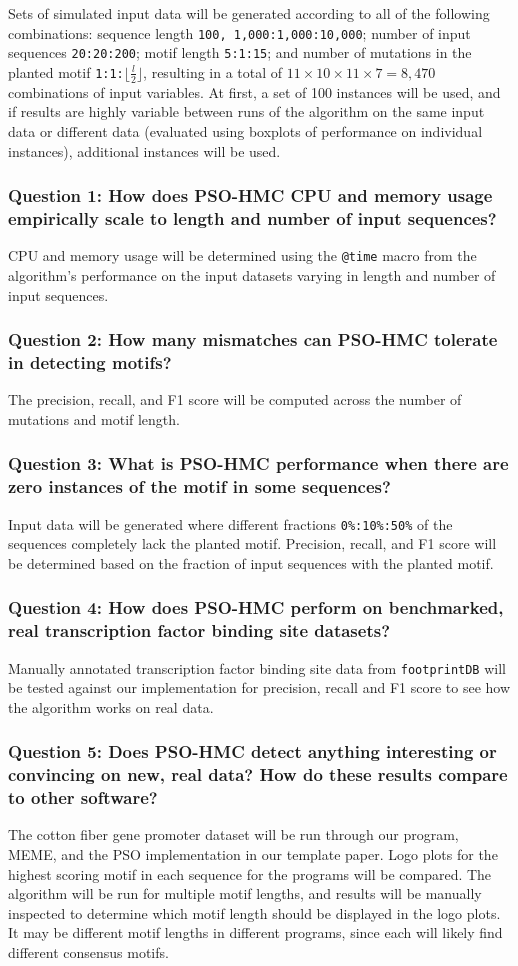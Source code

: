 \documentclass{article}
\begin{document}
  Sets of simulated input data will be generated according to all of the following combinations: sequence length \texttt{100, 1,000:1,000:10,000}; number of input sequences \texttt{20:20:200}; motif length \texttt{5:1:15}; and number of mutations in the planted motif \texttt{1:1:$\lfloor \frac{l}{2} \rfloor$}, resulting in a total of \texttt{$11 \times 10 \times 11 \times 7 = 8,470$} combinations of input variables. At first, a set of 100 instances will be used, and if results are highly variable between runs of the algorithm on the same input data or different data (evaluated using boxplots of performance on individual instances), additional instances will be used.
\subsubsection{Question 1: How does PSO-HMC CPU and memory usage empirically scale to length and number of input sequences?}
CPU and memory usage will be determined using the \texttt{@time} macro from the algorithm's performance on the input datasets varying in length and number of input sequences.
\subsubsection{Question 2: How many mismatches can PSO-HMC tolerate in detecting motifs?}
The precision, recall, and F1 score will be computed across the number of mutations and motif length.
\subsubsection{Question 3: What is PSO-HMC performance when there are zero instances of the motif in some sequences?}
Input data will be generated where different fractions \texttt{0\%:10\%:50\%} of the sequences completely lack the planted motif. Precision, recall, and F1 score will be determined based on the fraction of input sequences with the planted motif.
\subsubsection{Question 4: How does PSO-HMC perform on benchmarked, real transcription factor binding site datasets?}
Manually annotated transcription factor binding site data from \texttt{footprintDB} will be tested against our implementation for precision, recall and F1 score to see how the algorithm works on real data.
\subsubsection{Question 5: Does PSO-HMC detect anything interesting or convincing on new, real data? How do these results compare to other software?}
The cotton fiber gene promoter dataset will be run through our program, MEME, and the PSO implementation in our template paper. Logo plots for the highest scoring motif in each sequence for the programs will be compared. The algorithm will be run for multiple motif lengths, and results will be manually inspected to determine which motif length should be displayed in the logo plots. It may be different motif lengths in different programs, since each will likely find different consensus motifs.
\end{document}
